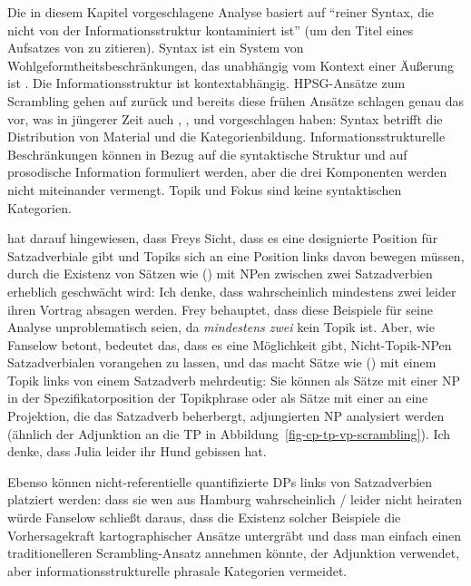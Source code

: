 Die in diesem Kapitel vorgeschlagene Analyse basiert auf "`reiner Syntax, die nicht von der Informationsstruktur kontaminiert ist"' (um den Titel eines Aufsatzes von \citealt{Fanselow2006a} zu zitieren). Syntax ist ein System von
Wohlgeformtheitsbeschränkungen, das unabhängig vom Kontext einer Äußerung ist \citep[]{Fanselow2006a}. Die Informationsstruktur ist kontextabhängig. HPSG-Ansätze zum Scrambling gehen
auf \citet{Gunji86a} zurück und bereits diese frühen Ansätze schlagen genau das vor, was in jüngerer Zeit auch
\citet{Fanselow2003b,Fanselow2006a}, \citet{NK2008a-u}, \citet[]{Struckmeier2017a} und
\citet{Haider2021a} vorgeschlagen haben: Syntax betrifft die Distribution von Material und die
Kategorienbildung. Informationsstrukturelle Beschränkungen können in Bezug auf die syntaktische Struktur \citep{EV94a,EV96a,DeKuthyInformationStructure} und auf prosodische Information formuliert werden, aber die drei Komponenten werden
nicht miteinander vermengt. Topik und Fokus sind keine syntaktischen Kategorien.

\citet{Fanselow2006a} hat darauf hingewiesen, dass Freys Sicht, dass es eine designierte
Position für Satzadverbiale gibt und Topiks sich an eine Position links davon bewegen müssen, durch die
Existenz von Sätzen wie () mit NPen zwischen zwei Satzadverbien erheblich geschwächt wird:
\ea
Ich denke, dass wahrscheinlich mindestens zwei leider ihren Vortrag absagen werden.
\z
Frey behauptet, dass diese Beispiele für seine Analyse unproblematisch seien, da
\emph{mindestens zwei} kein Topik ist. Aber, wie Fanselow betont, bedeutet das, dass es eine Möglichkeit gibt,
Nicht-Topik-NPen Satzadverbialen vorangehen zu lassen, und das macht Sätze wie () mit einem Topik links von einem
Satzadverb mehrdeutig: Sie können als Sätze mit einer NP in der Spezifikatorposition
der Topikphrase oder als Sätze mit einer an eine Projektion, die das Satzadverb beherbergt, adjungierten NP
analysiert werden (ähnlich der Adjunktion an die TP in Abbildung~\ref{fig-cp-tp-vp-scrambling}).
\ea
Ich denke, dass Julia leider ihr Hund gebissen hat.
\z

\noindent
Ebenso können nicht-referentielle quantifizierte DPs links von Satzadverbien platziert werden:
\ea
dass sie wen aus Hamburg wahrscheinlich / leider nicht heiraten würde
\z
Fanselow schließt daraus, dass die Existenz solcher Beispiele die Vorhersagekraft
kartographischer Ansätze untergräbt und dass man einfach einen traditionelleren Scrambling-Ansatz
annehmen könnte, der Adjunktion verwendet, aber informationsstrukturelle phrasale Kategorien vermeidet.

